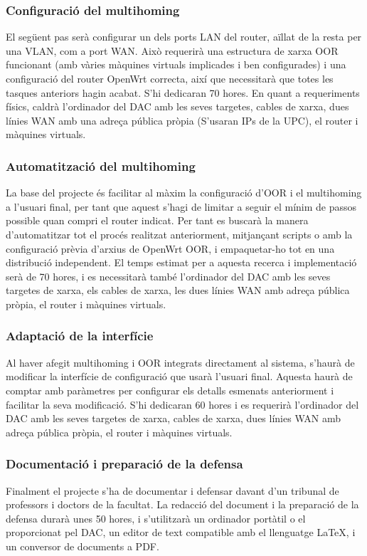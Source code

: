 \documentclass[11pt]{article}
\begin{document}
\subsubsection{Configuració del multihoming}
El següent pas serà configurar un dels ports LAN del router, aïllat de la resta per una VLAN, com a port WAN. Això requerirà una estructura de xarxa OOR funcionant (amb vàries màquines virtuals implicades i ben configurades) i una configuració del router OpenWrt  correcta, així que necessitarà que totes les tasques anteriors hagin acabat. S’hi dedicaran 70 hores. En quant a requeriments físics, caldrà l’ordinador del DAC amb les seves targetes, cables de xarxa, dues línies WAN amb una adreça pública pròpia (S’usaran IPs de la UPC), el router i màquines virtuals.
\subsubsection{Automatització del multihoming}
La base del projecte és facilitar al màxim la configuració d’OOR i el multihoming a l’usuari final, per tant que aquest s’hagi de limitar a seguir el mínim de passos possible quan compri el router indicat. Per tant es buscarà la manera d’automatitzar tot el procés realitzat anteriorment, mitjançant scripts o amb la configuració prèvia d’arxius de OpenWrt OOR, i empaquetar-ho tot en una distribució independent. El temps estimat per a aquesta recerca i implementació serà de 70 hores, i es necessitarà també l’ordinador del DAC amb les seves targetes de xarxa, els cables de xarxa, les dues línies WAN amb adreça pública pròpia, el router i màquines virtuals.
\subsubsection{Adaptació de la interfície}
Al haver afegit multihoming i OOR integrats directament al sistema, s’haurà de modificar la interfície de configuració que usarà l’usuari final. Aquesta haurà de comptar amb paràmetres per configurar els detalls esmenats anteriorment i facilitar la seva modificació. S’hi dedicaran 60 hores i es requerirà l’ordinador del DAC amb les seves targetes de xarxa, cables de xarxa, dues línies WAN amb adreça pública pròpia, el router i màquines virtuals.
\subsubsection{Documentació i preparació de la defensa}
Finalment el projecte s’ha de documentar i defensar davant d’un tribunal de professors i doctors de la facultat. La redacció del document i la preparació de la defensa durarà unes 50 hores, i s’utilitzarà un ordinador portàtil o el proporcionat pel DAC, un editor de text compatible amb el llenguatge LaTeX, i un conversor de documents a PDF.
\end{document}
